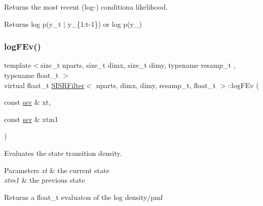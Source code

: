 Returns the most recent (log-\/) conditiona likelihood. 

\begin{DoxyReturn}{Returns}
log p(y\+\_\+t $\vert$ y\+\_\+\{1\+:t-\/1\}) or log p(y\+\_) 
\end{DoxyReturn}
\mbox{\label{classSISRFilter_a7aa1e90a0b641728d5f8d7bd8c699ba8}} 
\subsubsection{\texorpdfstring{log\+F\+Ev()}{logFEv()}}
{\footnotesize\ttfamily template$<$size\+\_\+t nparts, size\+\_\+t dimx, size\+\_\+t dimy, typename resamp\+\_\+t , typename float\+\_\+t $>$ \\
virtual float\+\_\+t \hyperlink{classSISRFilter}{S\+I\+S\+R\+Filter}$<$ nparts, dimx, dimy, resamp\+\_\+t, float\+\_\+t $>$\+::log\+F\+Ev (\begin{DoxyParamCaption}\item[{const \hyperlink{classSISRFilter_abfec45cf57ea6fadae4a9da8b0042351}{ssv} \&}]{xt,  }\item[{const \hyperlink{classSISRFilter_abfec45cf57ea6fadae4a9da8b0042351}{ssv} \&}]{xtm1 }\end{DoxyParamCaption})\hspace{0.3cm}{\ttfamily [pure virtual]}}



Evaluates the state transition density. 


\begin{DoxyParams}{Parameters}
{\em xt} & the current state \\
\hline
{\em xtm1} & the previous state \\
\hline
\end{DoxyParams}
\begin{DoxyReturn}{Returns}
a float\+\_\+t evaluaton of the log density/pmf 
\end{DoxyReturn}
\mbox{\label{classSISRFilter_a73fe8481e4cb40142544c04823851aa8}} 
